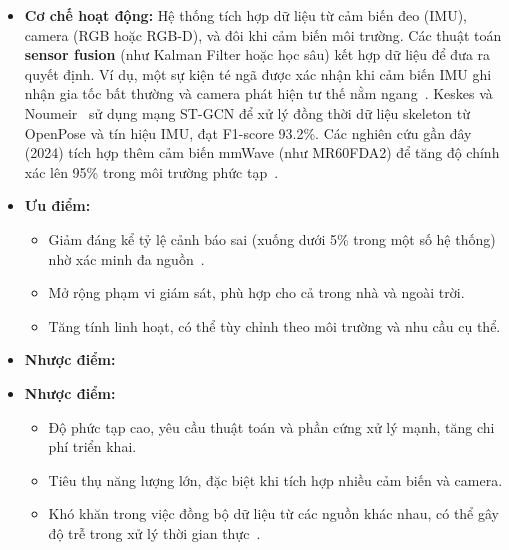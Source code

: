 \begin{itemize}
    \item \textbf{Cơ chế hoạt động:} Hệ thống tích hợp dữ liệu từ cảm biến đeo (IMU), camera (RGB hoặc RGB-D), và đôi khi cảm biến môi trường. Các thuật toán \textbf{sensor fusion} (như Kalman Filter hoặc học sâu) kết hợp dữ liệu để đưa ra quyết định. Ví dụ, một sự kiện té ngã được xác nhận khi cảm biến IMU ghi nhận gia tốc bất thường và camera phát hiện tư thế nằm ngang~\cite{rougier2011}. Keskes và Noumeir~\cite{keskes2021} sử dụng mạng ST-GCN để xử lý đồng thời dữ liệu skeleton từ OpenPose và tín hiệu IMU, đạt F1-score 93.2\%. Các nghiên cứu gần đây (2024) tích hợp thêm cảm biến mmWave (như MR60FDA2) để tăng độ chính xác lên 95\% trong môi trường phức tạp~\cite{mmwave2025}.
    \item \textbf{Ưu điểm:} 
    \begin{itemize}
        \item Giảm đáng kể tỷ lệ cảnh báo sai (xuống dưới 5\% trong một số hệ thống) nhờ xác minh đa nguồn~\cite{multimodal2024}.
        \item Mở rộng phạm vi giám sát, phù hợp cho cả trong nhà và ngoài trời.
        \item Tăng tính linh hoạt, có thể tùy chỉnh theo môi trường và nhu cầu cụ thể.
    \end{itemize}
    \item \textbf{Nhược điểm:}
    \item \textbf{Nhược điểm:}
    \begin{itemize}
        \item Độ phức tạp cao, yêu cầu thuật toán và phần cứng xử lý mạnh, tăng chi phí triển khai.
        \item Tiêu thụ năng lượng lớn, đặc biệt khi tích hợp nhiều cảm biến và camera.
        \item Khó khăn trong việc đồng bộ dữ liệu từ các nguồn khác nhau, có thể gây độ trễ trong xử lý thời gian thực~\cite{liu2018}.
    \end{itemize}
\end{itemize}

